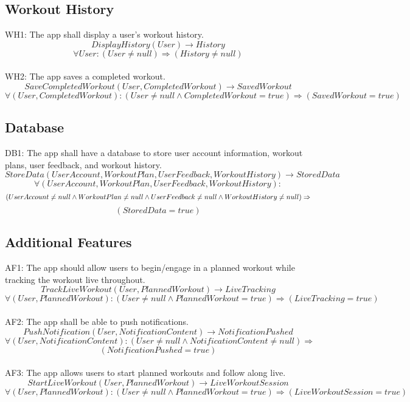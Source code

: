 \documentclass[12pt]{article}
\begin{document}
\subsection{Workout History}
WH1: The app shall display a user’s workout history.
\[DisplayHistory(User) \rightarrow History \]
\[ \forall User: (User \neq null) \Rightarrow (History \neq null) \]\\

WH2: The app saves a completed workout.
\[SaveCompletedWorkout(User, CompletedWorkout) \rightarrow SavedWorkout \]
\[ \forall (User, CompletedWorkout): (User \neq null \land CompletedWorkout = true) \Rightarrow (SavedWorkout = true) \]

\subsection{Database}
DB1: The app shall have a database to store user account information, workout plans, user feedback, and workout history.
\[StoreData(UserAccount, WorkoutPlan, UserFeedback, WorkoutHistory) \rightarrow StoredData \]
\[ \forall (UserAccount, WorkoutPlan, UserFeedback, WorkoutHistory):\] 
\[(UserAccount \neq null \land WorkoutPlan \neq null \land UserFeedback \neq null \land WorkoutHistory \neq null) \\
\Rightarrow\] \[(StoredData = true) \]

\subsection{Additional Features}
AF1: The app should allow users to begin/engage in a planned workout while tracking the workout live throughout.
\[TrackLiveWorkout(User, PlannedWorkout) \rightarrow LiveTracking \]
\[ \forall (User, PlannedWorkout): (User \neq null \land PlannedWorkout = true) \Rightarrow (LiveTracking = true) \]\\

AF2: The app shall be able to push notifications.
\[PushNotification(User, NotificationContent) \rightarrow NotificationPushed \]
\[ \forall (User, NotificationContent): (User \neq null \land NotificationContent \neq null) \Rightarrow\] \[(NotificationPushed = true) \]\\

AF3: The app allows users to start planned workouts and follow along live.
\[StartLiveWorkout(User, PlannedWorkout) \rightarrow LiveWorkoutSession \]
\[ \forall (User, PlannedWorkout): (User \neq null \land PlannedWorkout = true) \Rightarrow (LiveWorkoutSession = true) \]\\
\end{document}
